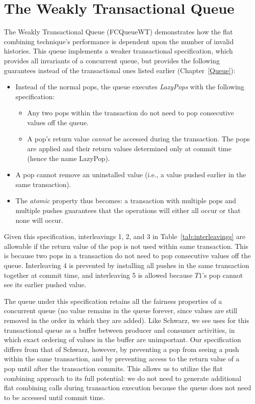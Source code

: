 \section{The Weakly Transactional Queue} 

The Weakly Transactional Queue (FCQueueWT) demonstrates how the flat combining technique's performance is dependent upon the number of invalid histories. This queue implements a weaker transactional specification, which provides all invariants of a concurrent queue, but provides the following guarantees instead of the transactional ones listed earlier (Chapter~\ref{Queue}):
\begin{itemize}
    \item Instead of the normal pops, the queue executes \emph{LazyPops} with the following specification:
        \begin{itemize}
            \item Any two pops within the transaction do not need to pop consecutive values off the queue.
            \item A pop's return value \emph{cannot} be accessed during the transaction. The pops are applied and their return values determined only at commit time (hence the name LazyPop). 
        \end{itemize}
    \item A pop cannot remove an uninstalled value (i.e., a value pushed earlier in the same transaction).
    \item The \emph{atomic} property thus becomes: a transaction with multiple pops and multiple pushes guarantees that the operations will either all occur or that none will occur.
\end{itemize}

Given this specification, interleavings 1, 2, and 3 in Table~\ref{tab:interleavings} are allowable if the return value of the pop is not used within same transaction. This is because two pops in a transaction do not need to pop consecutive values off the queue. Interleaving 4 is prevented by installing all pushes in the same transaction together at commit time, and interleaving 5 is allowed because $T1$'s pop cannot see its earlier pushed value.

The queue under this specification retains all the fairness properties of a concurrent queue (no value remains in the queue forever, since values are still removed in the order in which they are added). Like Schwarz\cite{schwarz}, we see uses for this transactional queue as a buffer between producer and consumer activities, in which exact ordering of values in the buffer are unimportant.
Our specification differs from that of Schwarz\cite{schwarz}, however, by preventing a pop from seeing a push within the same transaction, and by preventing access to the return value of a pop until after the transaction commits. This allows us to utilize the flat combining approach to its full potential: we do not need to generate additional flat combining calls during transaction execution because the queue does not need to be accessed until commit time.

